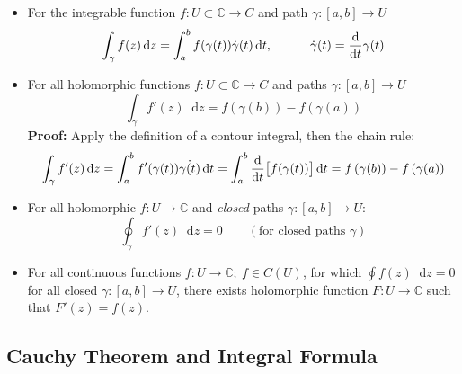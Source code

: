 \documentclass[11pt, a4paper]{article}
\newcommand{\C}{\mathbb{C}} %
\newcommand{\diff}{\mathop{}\!\mathrm{d}} %
\begin{document}
\begin{itemize}
	\item For the integrable function $ f: U \subset \C \to C $ and path $ \gamma: [a, b] \to U $
	\begin{equation*}
		\int_{\gamma} f(z) \diff z = \int_{a}^{b}f(\gamma(t)) \dot{\gamma}(t) \diff t, \qquad \quad  \dot{\gamma}(t) = \dv{}{t}\gamma(t)
	\end{equation*}

	
	\item For all holomorphic functions $ f: U \subset \C \to C $ and paths $ \gamma: [a, b] \to U $
	\begin{equation*}
		\int_{\gamma} f'(z) \diff z = f\left(\gamma(b)\right) - f\left(\gamma(a)\right)
	\end{equation*}
	\textbf{Proof: } Apply the definition of a contour integral, then the chain rule:
	\begin{equation*}
		\int_{\gamma} f'(z) \diff z = \int_{a}^{b} f'(\gamma(t)) \dot{\gamma(t)} \diff t = \int_{a}^{b}\dv{}{t} \big[f(\gamma(t))\big] \diff t = f\left(\gamma(b)\right) - f\left(\gamma(a)\right)
	\end{equation*}
	
	\item For all holomorphic $ f: U \to \C $ and \textit{closed} paths $ \gamma: [a, b] \to U $:
	\begin{equation*}
		\oint_{\gamma} f'(z) \diff z = 0 \qquad (\text{for closed paths } \gamma )
	\end{equation*}
	
	\item For all continuous functions $ f: U \to \C; \ f \in C(U) $, for which $ \oint f(z) \diff z = 0 $ for all closed $ \gamma : [a, b] \to U $, there exists holomorphic function $ F: U \to \C $ such that $ F'(z) = f(z) $.
	
\end{itemize}






\subsection{Cauchy Theorem and Integral Formula}
\end{document}
